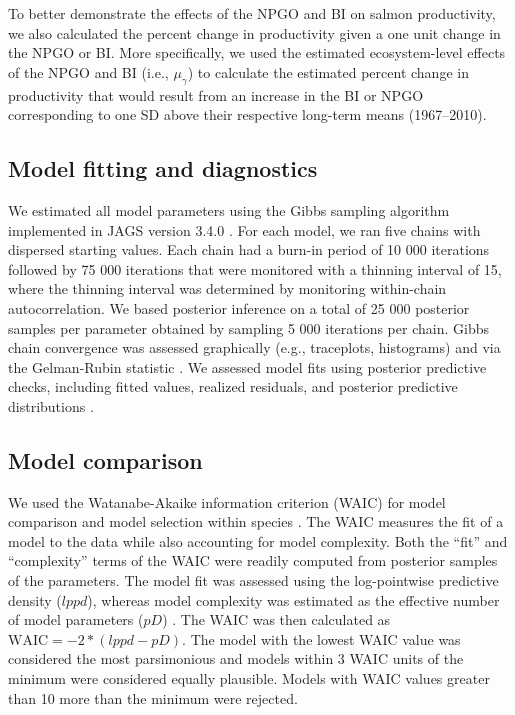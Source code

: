 To better demonstrate the effects of the NPGO and BI on salmon productivity, we
also calculated the percent change in productivity given a one unit change in
the NPGO or BI. More specifically, we used the estimated ecosystem-level effects
of the NPGO and BI (i.e., \(\mu_{\gamma}\)) to calculate the estimated percent
change in productivity that would result from an increase in the BI or NPGO
corresponding to one SD above their respective long-term means (1967--2010).


\subsection{Model fitting and diagnostics}

We estimated all model parameters using the Gibbs sampling algorithm implemented
in JAGS version 3.4.0 \citep{Plummer2003}. For each model, we ran five chains
with dispersed starting values. Each chain had a burn-in period of 10 000
iterations followed by 75 000 iterations that were monitored with a thinning
interval of 15, where the thinning interval was determined by monitoring
within-chain autocorrelation. We based posterior inference on a total of 25 000
posterior samples per parameter obtained by sampling 5 000 iterations per chain.
Gibbs chain convergence was assessed graphically (e.g., traceplots, histograms)
and via the Gelman-Rubin statistic \citep{Gelman1992, Brooks1998}. We assessed
model fits using posterior predictive checks, including fitted values, realized
residuals, and posterior predictive distributions \citep{Gelman2004a}.


\subsection{Model comparison}

We used the Watanabe-Akaike information criterion (WAIC) for model comparison
and model selection within species \citep{Watanabe2010, Gelman2013a}. The WAIC
measures the fit of a model to the data while also accounting for model
complexity. Both the ``fit'' and ``complexity'' terms of the WAIC were readily
computed from posterior samples of the parameters. The model fit was assessed
using the log-pointwise predictive density (\(lppd\)), whereas model complexity
was estimated as the effective number of model parameters (\(pD\))
\citep{Watanabe2010, Gelman2013a}. The WAIC was then calculated as \(\text{WAIC}
= -2 * (lppd - pD)\). The model with the lowest WAIC value was considered the
most parsimonious and models within 3 WAIC units of the minimum were considered
equally plausible. Models with WAIC values greater than 10 more than the minimum
were rejected.


